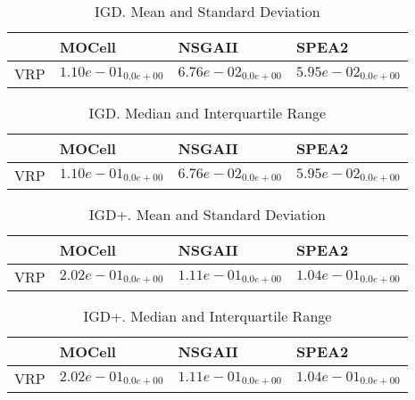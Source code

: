 \documentclass{article}
\begin{document}
\begin{table}
\caption{IGD. Mean and Standard Deviation}
\label{table: IGD}
\centering
\begin{scriptsize}
\begin{tabular}{llll}
\hline & MOCell & NSGAII &  SPEA2\\
\hline 
VRP & $  1.10e-01_{ 0.0e+00}$ & \cellcolor{gray25}$  6.76e-02_{ 0.0e+00}$ & \cellcolor{gray95}$  5.95e-02_{ 0.0e+00}$ \\
\hline
\end{tabular}
\end{scriptsize}
\end{table}

\begin{table}
\caption{IGD. Median and Interquartile Range}
\label{table: IGD}
\centering
\begin{scriptsize}
\begin{tabular}{llll}
\hline & MOCell & NSGAII &  SPEA2\\
\hline 
VRP & $  1.10e-01_{ 0.0e+00}$ & \cellcolor{gray25}$  6.76e-02_{ 0.0e+00}$ & \cellcolor{gray95}$  5.95e-02_{ 0.0e+00}$ \\
\hline
\end{tabular}
\end{scriptsize}
\end{table}

\begin{table}
\caption{IGD+. Mean and Standard Deviation}
\label{table: IGD+}
\centering
\begin{scriptsize}
\begin{tabular}{llll}
\hline & MOCell & NSGAII &  SPEA2\\
\hline 
VRP & $  2.02e-01_{ 0.0e+00}$ & \cellcolor{gray25}$  1.11e-01_{ 0.0e+00}$ & \cellcolor{gray95}$  1.04e-01_{ 0.0e+00}$ \\
\hline
\end{tabular}
\end{scriptsize}
\end{table}

\begin{table}
\caption{IGD+. Median and Interquartile Range}
\label{table: IGD+}
\centering
\begin{scriptsize}
\begin{tabular}{llll}
\hline & MOCell & NSGAII &  SPEA2\\
\hline 
VRP & $  2.02e-01_{ 0.0e+00}$ & \cellcolor{gray25}$  1.11e-01_{ 0.0e+00}$ & \cellcolor{gray95}$  1.04e-01_{ 0.0e+00}$ \\
\hline
\end{tabular}
\end{scriptsize}
\end{table}
\end{document}
